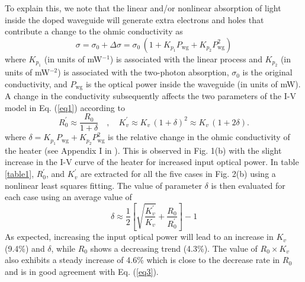 To explain this, we note that the linear and/or nonlinear absorption of light inside the doped waveguide will generate extra electrons and holes that contribute a change to the ohmic conductivity as
%
\begin{equation}\label{eq2}
\sigma = \sigma_0 + \Delta \sigma = \sigma_0 \, (1+K_{p_1} P_\text{wg} + K_{p_2} P_\text{wg}^2)
\end{equation}
%
where $K_{p_1}$ (in units of mW$^{-1}$) is associated with the linear process and $K_{p_2}$ (in units of mW$^{-2}$) is associated with the two-photon absorption\cite{Zhou_PC}, $\sigma_0$ is the original conductivity, and $P_\text{wg}$ is the optical power inside the waveguide (in units of mW). A change in the conductivity subsequently affects the two parameters of the I-V model in Eq. (\ref{eq1}) according to
%
\begin{equation}\label{eq3}
R_0^\prime \approx \frac{R_0}{1+\delta} \quad , \quad K_v^\prime \approx K_v \, (1+\delta)^2 \approx K_v \, (1+2\delta) .
\end{equation}
%
where $\delta = K_{p_1} P_\text{wg} + K_{p_2} P_\text{wg}^2$ is the relative change in the ohmic conductivity of the heater (see Appendix I in \cite{Bahadori_Self_heating}). This is observed in Fig. 1(b) with the slight increase in the I-V curve of the heater for increased input optical power. In table \ref{table1}, $R_0^\prime$, and $K_v^\prime$ are extracted for all the five cases in Fig. 2(b) using a nonlinear least squares fitting. The value of parameter $\delta$ is then evaluated for each case using an average value of
%
\begin{equation}
\delta \approx \frac{1}{2}\left[\sqrt{\frac{K_v^\prime}{K_v}} + \frac{R_0}{R_0^\prime}\right] -1
\end{equation}
%
As expected, increasing the input optical power will lead to an increase in $K_v$ (9.4\%) and $\delta$, while $R_0$ shows a decreasing trend (4.3\%). The value of $R_0 \times K_v$ also exhibits a steady increase of 4.6\% which is close to the decrease rate in $R_0$ and is in  good agreement with Eq. (\ref{eq3}).

